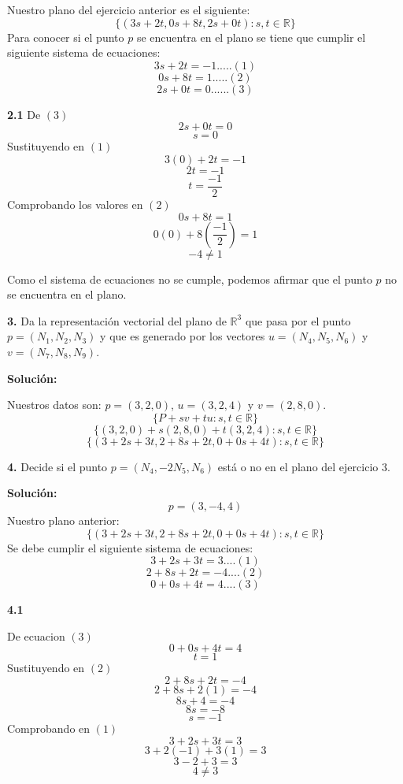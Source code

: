 \documentclass{article}
\begin{document}
Nuestro plano del ejercicio anterior es el siguiente:
$$\{(3s+2t,0s+8t,2s+0t): s,t \in \mathbb{R}\}$$
Para conocer si el punto $p$ se encuentra en el plano se tiene que cumplir el siguiente sistema de ecuaciones:
$$3s+2t = -1.....(1)$$
$$0s+8t = 1.....(2)$$
$$2s +0t = 0......(3)$$

\center\begin{minipage}[c]{5cm}
    \textbf{2.1}
    \vspace{10pt}
    De $(3)$
    $$2s +0t = 0$$
    $$s = 0$$
    Sustituyendo en $(1)$
    $$3(0)+2t = -1$$
    $$2t = -1$$
    $$t = \frac{-1}{2}$$
    Comprobando los valores en $(2)$
    $$0s+8t = 1$$
    $$0(0)+ 8(\frac{-1}{2}) = 1$$
    $$-4 \neq 1$$
\end{minipage}

Como el sistema de ecuaciones no se cumple, podemos afirmar que el punto $p$ no se encuentra en el plano.
\vspace{10pt}

\textbf{3.} Da la representación vectorial del plano de $\mathbb{R}^3$ que pasa por el punto $p = (N_1,N_2,N_3)$ y
que es generado por los vectores $u = (N_4, N_5, N_6)$ y $v = (N_7, N_8, N_9)$.
\vspace{10pt}

\textbf{Solución:}
\vspace*{10pt}

Nuestros datos son: $p = (3,2,0)$, $u = (3, 2, 4)$ y $v = (2, 8, 0)$.
$$\{P + sv + tu : s,t \in \mathbb{R}\}$$
$$\{(3,2,0) + s(2, 8, 0) + t(3, 2, 4) : s,t \in \mathbb{R}\}$$
$$\{(3+2s+3t, 2+8s+2t,0+0s+4t): s,t \in \mathbb{R}\}$$
\vspace{10pt}

\textbf{4.} Decide si el punto $p= (N_4, -2N_5, N_6)$ está o no en el plano del ejercicio 3.
\vspace*{10pt}

\textbf{Solución:}
\vspace{10pt}
$$p =(3, -4, 4)$$
Nuestro plano anterior:
$$\{(3+2s+3t, 2+8s+2t,0+0s+4t): s,t \in \mathbb{R}\}$$
Se debe cumplir el siguiente sistema de ecuaciones:
$$3+2s+3t = 3....(1)$$
$$2+8s+2t = -4....(2)$$
$$0+0s+4t=4....(3)$$

\center\begin{minipage}[c]{5cm}
    \textbf{4.1}
    \vspace{10pt}
    
    De ecuacion $(3)$
    $$0+0s+4t=4$$
    $$t = 1$$
    Sustituyendo en $(2)$
    $$2+8s+2t = -4$$
    $$2+ 8s + 2(1) = -4$$
    $$ 8s +4 = -4$$
    $$8s = -8$$
    $$s = -1$$
    Comprobando en $(1)$
    $$3+2s+3t = 3$$
    $$3+2(-1)+3(1) = 3$$
    $$3 -2 +3 = 3$$
    $$4 \neq 3$$
\end{minipage}
\end{document}

